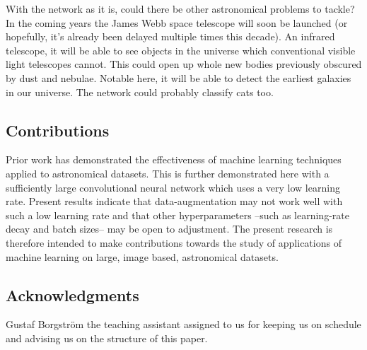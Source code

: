 With the network as it is, could there be other astronomical problems to tackle? In the coming years the James Webb space telescope will soon be launched (or hopefully, it's already been delayed multiple times this decade). An infrared telescope, it will be able to see objects in the universe which conventional visible light telescopes cannot. This could open up whole new bodies previously obscured by dust and nebulae. Notable here, it will be able to detect the earliest galaxies in our universe. The network could probably classify cats too.


\subsection{Contributions}
Prior work has demonstrated the effectiveness of machine learning techniques applied to astronomical datasets. This is further demonstrated here with a sufficiently large convolutional neural network which uses a very low learning rate. Present results indicate that data-augmentation may not work well with such a low learning rate and that other hyperparameters --such as learning-rate decay and batch sizes-- may be open to adjustment. The present research is therefore intended to make contributions towards the study of applications of machine learning on large, image based, astronomical datasets.


\subsection{Acknowledgments}

Gustaf Borgström the teaching assistant assigned to us for keeping us on schedule and advising us on the structure of this paper.
